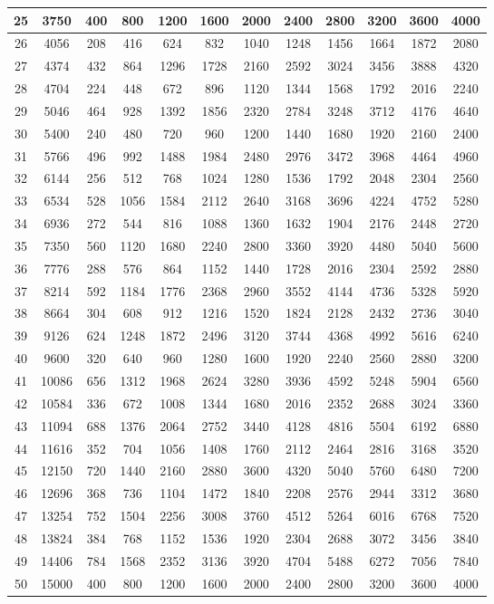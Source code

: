 \begin{center}
\begin{longtable}{|c|c|c|c|c|c|c|c|c|c|c|c|}
\hline
25 & 3750 & 400 & 800 & 1200 & 1600 & 2000 & 2400 & 2800 & 3200 & 3600 & 4000\tabularnewline
\hline
26 & 4056 & 208 & 416 & 624 & 832 & 1040 & 1248 & 1456 & 1664 & 1872 & 2080\tabularnewline
\hline
27 & 4374 & 432 & 864 & 1296 & 1728 & 2160 & 2592 & 3024 & 3456 & 3888 & 4320\tabularnewline
\hline
28 & 4704 & 224 & 448 & 672 & 896 & 1120 & 1344 & 1568 & 1792 & 2016 & 2240\tabularnewline
\hline
29 & 5046 & 464 & 928 & 1392 & 1856 & 2320 & 2784 & 3248 & 3712 & 4176 & 4640\tabularnewline
\hline
30 & 5400 & 240 & 480 & 720 & 960 & 1200 & 1440 & 1680 & 1920 & 2160 & 2400\tabularnewline
\hline
31 & 5766 & 496 & 992 & 1488 & 1984 & 2480 & 2976 & 3472 & 3968 & 4464 & 4960\tabularnewline
\hline
32 & 6144 & 256 & 512 & 768 & 1024 & 1280 & 1536 & 1792 & 2048 & 2304 & 2560\tabularnewline
\hline
33 & 6534 & 528 & 1056 & 1584 & 2112 & 2640 & 3168 & 3696 & 4224 & 4752 & 5280\tabularnewline
\hline
34 & 6936 & 272 & 544 & 816 & 1088 & 1360 & 1632 & 1904 & 2176 & 2448 & 2720\tabularnewline
\hline
35 & 7350 & 560 & 1120 & 1680 & 2240 & 2800 & 3360 & 3920 & 4480 & 5040 & 5600\tabularnewline
\hline
36 & 7776 & 288 & 576 & 864 & 1152 & 1440 & 1728 & 2016 & 2304 & 2592 & 2880\tabularnewline
\hline
37 & 8214 & 592 & 1184 & 1776 & 2368 & 2960 & 3552 & 4144 & 4736 & 5328 & 5920\tabularnewline
\hline
38 & 8664 & 304 & 608 & 912 & 1216 & 1520 & 1824 & 2128 & 2432 & 2736 & 3040\tabularnewline
\hline
39 & 9126 & 624 & 1248 & 1872 & 2496 & 3120 & 3744 & 4368 & 4992 & 5616 & 6240\tabularnewline
\hline
40 & 9600 & 320 & 640 & 960 & 1280 & 1600 & 1920 & 2240 & 2560 & 2880 & 3200\tabularnewline
\hline
41 & 10086 & 656 & 1312 & 1968 & 2624 & 3280 & 3936 & 4592 & 5248 & 5904 & 6560\tabularnewline
\hline
42 & 10584 & 336 & 672 & 1008 & 1344 & 1680 & 2016 & 2352 & 2688 & 3024 & 3360\tabularnewline
\hline
43 & 11094 & 688 & 1376 & 2064 & 2752 & 3440 & 4128 & 4816 & 5504 & 6192 & 6880\tabularnewline
\hline
44 & 11616 & 352 & 704 & 1056 & 1408 & 1760 & 2112 & 2464 & 2816 & 3168 & 3520\tabularnewline
\hline
45 & 12150 & 720 & 1440 & 2160 & 2880 & 3600 & 4320 & 5040 & 5760 & 6480 & 7200\tabularnewline
\hline
46 & 12696 & 368 & 736 & 1104 & 1472 & 1840 & 2208 & 2576 & 2944 & 3312 & 3680\tabularnewline
\hline
47 & 13254 & 752 & 1504 & 2256 & 3008 & 3760 & 4512 & 5264 & 6016 & 6768 & 7520\tabularnewline
\hline
48 & 13824 & 384 & 768 & 1152 & 1536 & 1920 & 2304 & 2688 & 3072 & 3456 & 3840\tabularnewline
\hline
49 & 14406 & 784 & 1568 & 2352 & 3136 & 3920 & 4704 & 5488 & 6272 & 7056 & 7840\tabularnewline
\hline
50 & 15000 & 400 & 800 & 1200 & 1600 & 2000 & 2400 & 2800 & 3200 & 3600 & 4000\tabularnewline

\end{longtable}
\end{center}
